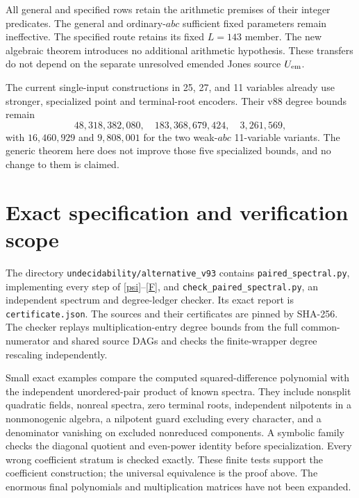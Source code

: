 \documentclass[11pt]{article}
\begin{document}
All general and specified rows retain the arithmetic premises of
their integer predicates. The general and ordinary-\(abc\) sufficient
fixed parameters remain ineffective. The specified route retains
its fixed \(L=143\) member. The new algebraic theorem introduces no
additional arithmetic hypothesis. These transfers do not depend on
the separate unresolved emended Jones source \(U_{\rm em}\).

The current single-input constructions in 25, 27, and 11 variables
already use stronger, specialized point and terminal-root encoders.
Their v88 degree bounds remain
\[
 48{,}318{,}382{,}080,\quad183{,}368{,}679{,}424,\quad
 3{,}261{,}569,
\]
with \(16{,}460{,}929\) and \(9{,}808{,}001\) for the two weak-\(abc\)
11-variable variants. The generic theorem here does not improve
those five specialized bounds, and no change to them is claimed.

\section{Exact specification and verification scope}

The directory \nolinkurl{undecidability/alternative_v93} contains
\nolinkurl{paired_spectral.py}, implementing every step of
\eqref{psi}--\eqref{F}, and
\nolinkurl{check_paired_spectral.py}, an independent spectrum and
degree-ledger checker. Its exact report is
\nolinkurl{certificate.json}. The sources and their certificates
are pinned by SHA-256. The checker replays multiplication-entry
degree bounds from the full common-numerator and shared source DAGs
and checks the finite-wrapper degree rescaling independently.

Small exact examples compare the computed squared-difference
polynomial with the independent unordered-pair product of known
spectra. They include nonsplit quadratic fields, nonreal spectra,
zero terminal roots, independent nilpotents in a nonmonogenic
algebra, a nilpotent guard excluding every character, and a denominator
vanishing on excluded nonreduced components. A symbolic family
checks the diagonal quotient and even-power identity before
specialization. Every wrong coefficient stratum is checked exactly.
These finite tests support the coefficient construction; the
universal equivalence is the proof above. The enormous final
polynomials and multiplication matrices have not been expanded.
\end{document}
